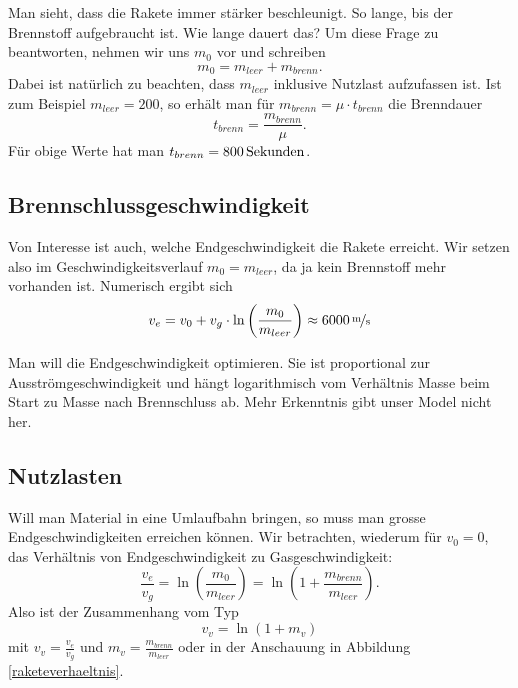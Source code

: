\documentclass[%
11pt,%
twoside,%
titlepage,%
swissgerman,%
headsepline%
]{scrartcl}
\theoremstyle{definition}
\theoremstyle{plain}
\begin{document}
Man sieht, dass die Rakete immer stärker beschleunigt. So lange, bis der Brennstoff aufgebraucht ist. Wie lange dauert das? Um diese Frage zu beantworten, nehmen wir uns $m_0$ vor und schreiben
$$m_0=m_{leer}+m_{brenn}.$$
Dabei ist natürlich zu beachten, dass $m_{leer}$ inklusive Nutzlast aufzufassen ist. Ist zum Beispiel $m_{leer}=200$, so erhält man für $m_{brenn}=\mu\cdot t_{brenn}$ die Brenndauer
$$t_{brenn}=\frac{m_{brenn}}{\mu}.$$
Für obige Werte hat man $t_{brenn}=\unit[800]{Sekunden}$.

\subsection{Brennschlussgeschwindigkeit}

Von Interesse ist auch, welche Endgeschwindigkeit die Rakete erreicht. Wir setzen also im Geschwindigkeitsverlauf $m_0=m_{leer}$, da ja kein Brennstoff mehr vorhanden ist. Numerisch ergibt sich
$$v_e=v_0+v_g\cdot\ln\left(\frac{m_0}{m_{leer}}\right)\approx\unitfrac[6000]{m}{s}$$

Man will die Endgeschwindigkeit optimieren. Sie ist proportional zur Ausströmgeschwindigkeit und hängt logarithmisch vom Verhältnis Masse beim Start zu Masse nach Brennschluss ab. Mehr Erkenntnis gibt unser Model nicht her.

\subsection{Nutzlasten}

Will man Material in eine Umlaufbahn bringen, so muss man grosse Endgeschwindigkeiten erreichen können. Wir betrachten, wiederum für $v_0=0$, das Verhältnis von Endgeschwindigkeit zu Gasgeschwindigkeit:
$$\frac{v_e}{v_g}=\ln\left(\frac{m_0}{m_{leer}}\right)=\ln\left(1+\frac{m_{brenn}}{m_{leer}}\right).$$
Also ist der Zusammenhang vom Typ
$$v_v=\ln(1+m_v)$$
mit $v_v=\frac{v_e}{v_g}$ und $m_v=\frac{m_{brenn}}{m_{leer}}$ oder in der Anschauung in Abbildung \ref{raketeverhaeltnis}.
\end{document}
